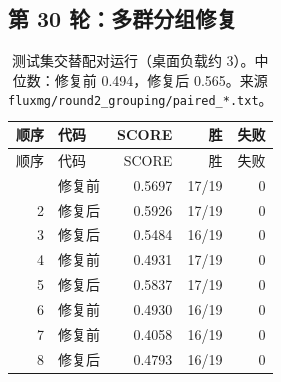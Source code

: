 \subsection{第 30 轮：多群分组修复}
{\footnotesize\setlength{\tabcolsep}{4pt}
\begin{longtable}{rlrrr}
\caption{测试集交替配对运行（桌面负载约 3）。中位数：修复前 0.494，修复后 0.565。来源 \texttt{fluxmg/round2\_grouping/paired\_*.txt}。}\\
\toprule
顺序 & 代码 & SCORE & 胜 & 失败 \\
\midrule
\endfirsthead
\toprule
顺序 & 代码 & SCORE & 胜 & 失败 \\
\midrule
\endhead
\bottomrule
\endlastfoot
1 & 修复前 & 0.5697 & 17/19 & 0 \\
2 & 修复后 & 0.5926 & 17/19 & 0 \\
3 & 修复后 & 0.5484 & 16/19 & 0 \\
4 & 修复前 & 0.4931 & 17/19 & 0 \\
5 & 修复后 & 0.5837 & 17/19 & 0 \\
6 & 修复前 & 0.4930 & 16/19 & 0 \\
7 & 修复前 & 0.4058 & 16/19 & 0 \\
8 & 修复后 & 0.4793 & 16/19 & 0 \\
\end{longtable}}
